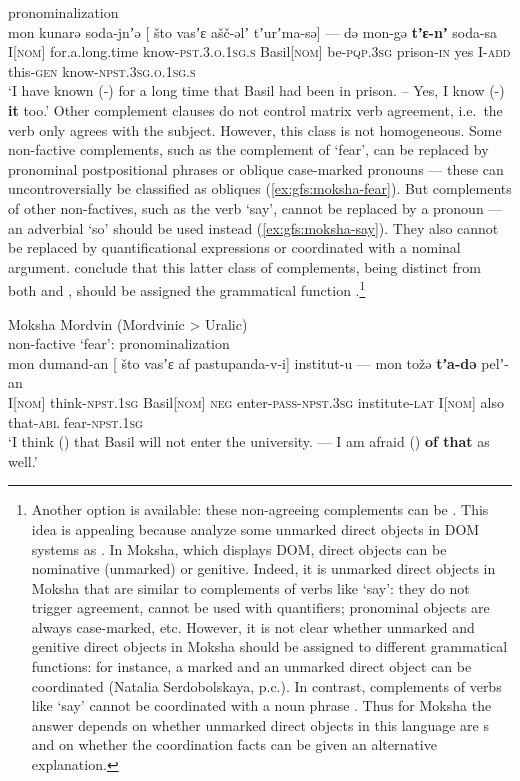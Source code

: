 \documentclass[output=paper]{../langscibook}
\begin{document}
    \ex pronominalization\\
    \gll mon kunarə soda-jnʼə [ što vasʼɛ ašč-əlʼ tʼurʼma-sə]{ ---} də mon-gə \textbf{tʼɛ-nʼ} soda-sa\\
    I[\textsc{nom}] for.a.long.time know-\textsc{pst.3.o.1sg.s} {} {\COMP} Basil[\textsc{nom}] be-\textsc{pqp.3sg} prison-\textsc{in} yes I-\textsc{add} this-\textsc{gen} know-\textsc{npst.3sg.o.1sg.s}\\
    \glt `I have known (\SUBJ-\OBJ) for a long time that Basil had been in prison. – Yes, I know (\SUBJ-\OBJ) \textbf{it} too.'
    \z
 \z
Other complement clauses do not control matrix verb agreement, i.e.\ the verb only agrees with the subject. However, this class is not homogeneous. Some non-factive complements, such as the complement of `fear', can be replaced by pronominal postpositional phrases or oblique case-marked pronouns --- these can uncontroversially be classified as obliques (\ref{ex:gfs:moksha-fear}). But complements of other non-factives, such as the verb `say', cannot be replaced by a pronoun --- an adverbial `so' should be used instead (\ref{ex:gfs:moksha-say}). They also cannot be replaced by quantificational expressions or coordinated with a nominal argument. \citet{BelyaevKozhemyakinaSerdobolskaya2017} conclude that this latter class of complements, being distinct from both \OBJ and {\OBLTHETA}, should be assigned the grammatical function \COMP.\footnote{Another option is available: these non-agreeing complements can be {\OBJTHETA}. This idea is appealing because \citet{DN} analyze some unmarked direct objects in DOM systems as {\OBJTHETA}. In Moksha, which displays DOM, direct objects can be nominative (unmarked) or genitive. Indeed, it is unmarked direct objects in Moksha that are similar to complements of verbs like `say': they do not trigger agreement, cannot be used with quantifiers; pronominal objects are always case-marked, etc. However, it is not clear whether unmarked and genitive direct objects in Moksha should be assigned to different grammatical functions: for instance, a marked and an unmarked direct object can be coordinated (Natalia Serdobolskaya, p.c.). In contrast, complements of verbs like `say' cannot be coordinated with a noun phrase \citep{BelyaevKozhemyakinaSerdobolskaya2017}. Thus for Moksha the answer depends on whether unmarked direct objects in this language are {\OBJTHETA}s and on whether the coordination facts can be given an alternative explanation.}
 
 \ea\label{ex:gfs:moksha-fear} Moksha Mordvin (Mordvinic > Uralic)\\
    non-factive `fear': pronominalization\\
    \gll mon dumand-an [ što vasʼɛ af pastupanda-v-i] institut-u{ ---} mon tožə \textbf{tʼa-də} pelʼ-an\\
    I[\textsc{nom}] think-\textsc{npst.1sg} {} {\COMP} Basil[\textsc{nom}] \textsc{neg} enter-\textsc{pass-npst.3sg} institute-\textsc{lat} I[\textsc{nom}] also that-\textsc{abl} fear-\textsc{npst.1sg}\\
    \glt `I think (\SUBJ) that Basil will not enter the university. --- I am afraid (\SUBJ) \textbf{of that} as well.'
    
\end{document}
